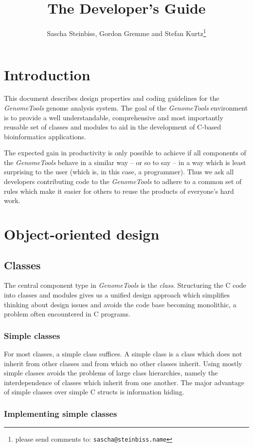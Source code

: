 \documentclass[11pt,final]{article}
\title{The \Gt Developer's Guide}
\author{Sascha Steinbiss, Gordon Gremme and Stefan
        Kurtz\thanks{please send comments to:
        \texttt{sascha@steinbiss.name}}}
\newcommand{\Gt}[0]{\emph{GenomeTools}\xspace}
\begin{document}
\maketitle
\tableofcontents


\section{Introduction}
This document describes design properties and coding guidelines for the \Gt
genome analysis system. The goal of the \Gt environment is to provide a
well understandable, comprehensive and most importantly reusable set of classes
and modules to aid in the development of C-based bioinformatics applications.

The expected gain in productivity is only possible to achieve if all
components of the \Gt behave in a similar way -- or so to say -- in a way which
is least surprising to the user (which is, in this case, a programmer).
Thus we ask all developers contributing code to the \Gt to adhere to a common
set of rules which make it easier for others to reuse the products of
everyone's hard work.


\section{Object-oriented design}
\subsection{Classes}

The central component type in \Gt is the \emph{class}. Structuring the C code
into classes and modules gives us a unified design approach which simplifies
thinking about design issues and avoids the code base becoming monolithic, a
problem often encountered in C programs.

\subsubsection{Simple classes}

For most classes, a simple class suffices. A simple class is a class which does
not inherit from other classes and from which no other classes inherit. Using
mostly simple classes avoids the problems of large class hierarchies, namely
the interdependence of classes which inherit from one another. The major
advantage of simple classes over simple C structs is information hiding.

\subsubsection{Implementing simple classes}
\label {simpleclasses}
\end{document}
